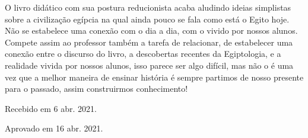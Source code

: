 \begin{refsection}
    O livro didático com sua postura reducionista acaba aludindo ideias simplistas sobre a civilização egípcia na qual ainda pouco se fala como está o Egito hoje. Não se estabelece uma conexão com o dia a dia, com o vivido por nossos alunos. Compete assim ao professor também a tarefa de relacionar, de estabelecer uma conexão entre o discurso do livro, a descobertas recentes da Egiptologia, e a realidade vivida por nossos alunos, isso parece ser algo difícil, mas não o é uma vez que a melhor maneira de ensinar história é sempre partimos de nosso presente para o passado, assim construirmos conhecimento!


    \nocite{Presse2018Tumba}

    \printbibliography[heading=subbibliography,notcategory=fullcited]

    \hfill Recebido em 6 abr. 2021.

    \hfill Aprovado em 16 abr. 2021.

    \label{chap:sairpiramideend}

\end{refsection}
